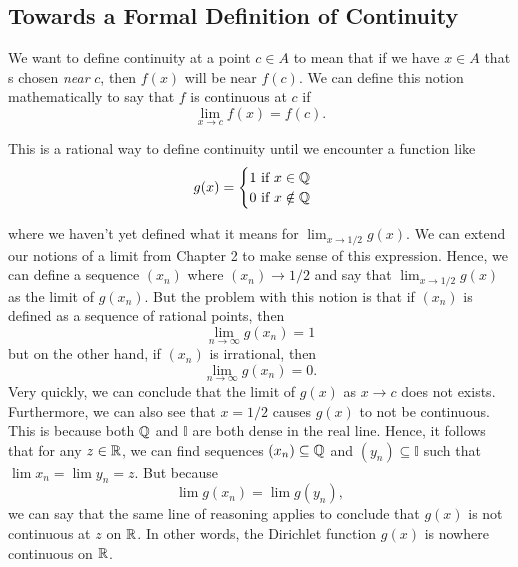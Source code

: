 
\subsection{Towards a Formal Definition of Continuity}

We want to define continuity at a point \( c \in A  \) to mean that if we have \( x \in A  \) that s chosen \textit{near} \( c \), then \( f(x) \) will be near \( f(c) \). We can define this notion mathematically to say that \( f \) is continuous at \( c  \) if 
\[  \lim_{ x  \to  c } f(x) = f(c). \]

This is a rational way to define continuity until we encounter a function like 
\[ g(x) = 
\begin{cases}
    1 ~ \text{if} ~ x \in \mathbb{Q}  \\
    0 ~ \text{if} ~ x \notin \mathbb{Q} 
\end{cases} \]
 
where we haven't yet defined what it means for \( \lim_{x \to 1/2} g(x) \). We can extend our notions of a limit from Chapter 2 to make sense of this expression. Hence, we can define a sequence \( (x_n) \) where \( (x_n) \to 1/2  \) and say that \( \lim_{ x \to 1/2 } g(x) \) as the limit of \( g(x_n) \). But the problem with this notion is that if \( (x_n) \) is defined as a sequence of rational points, then 
\[  \lim_{ n \to \infty} g(x_n) = 1  \]
but on the other hand, if \( (x_n) \) is irrational, then 
\[  \lim_{ n \to \infty  } g(x_n) = 0. \]
Very quickly, we can conclude that the limit of \( g(x) \) as \( x \to c  \) does not exists. Furthermore, we can also see that \( x = 1/2 \) causes \( g(x) \) to not be continuous. This is because both \( \mathbb{Q}  \) and \( \mathbb{I} \) are both dense in the real line. Hence, it follows that for any \( z \in \mathbb{R}  \), we can find sequences \( (x_n) \subseteq \mathbb{Q}  \) and \( (y_n) \subseteq \mathbb{I} \) such that 
\( \lim x_n = \lim y_n = z.  \) But because 
\[  \lim g(x_n) = \lim g(y_n),  \]
we can say that the same line of reasoning applies to conclude that \( g(x) \) is not continuous at \( z  \) on \( \mathbb{R}  \). In other words, the Dirichlet function \( g(x) \) is nowhere continuous on \( \mathbb{R}  \).


